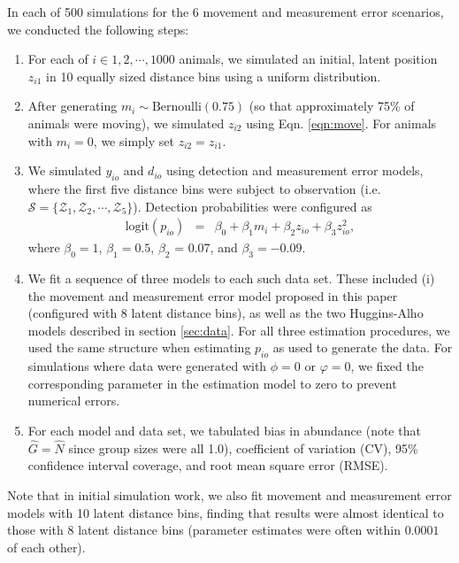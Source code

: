 \documentclass[12pt,fleqn]{article}
\begin{document}
In each of 500 simulations for the 6 movement and measurement error scenarios, we conducted the following steps:
\begin{enumerate}
  \item For each of $i \in 1,2,\cdots,1000$ animals, we simulated an initial, latent position $z_{i1}$ in 10 equally sized distance bins using a uniform distribution.
  \item After generating $m_i \sim \text{Bernoulli}(0.75)$ (so that approximately 75\% of animals were moving), we simulated $z_{i2}$ using Eqn. \ref{eqn:move}.  For animals with $m_i=0$, we simply set $z_{i2}=z_{i1}$.
  \item We simulated $y_{io}$ and $d_{io}$ using detection and measurement error models, where the first five distance bins were subject to observation (i.e. $\mathcal{S} = \{ \mathcal{Z}_1, \mathcal{Z}_2, \cdots, \mathcal{Z}_5 \} $).  Detection probabilities were configured as
      \begin{eqnarray*}
        \text{logit}(p_{io}) & = & \beta_0 + \beta_1 m_i + \beta_2 z_{io} + \beta_3 z_{io}^2,
      \end{eqnarray*}
      where $\beta_0 = 1$, $\beta_1 = 0.5$, $\beta_2$ = 0.07, and $\beta_3 = -0.09$.
  \item We fit a sequence of three models to each such data set.  These included (i) the movement and measurement error model proposed in this paper (configured with 8 latent distance bins), as well as the two Huggins-Alho models described in section \ref{sec:data}. For all three estimation procedures, we used the same structure when estimating $p_{io}$ as used to generate the data.  For simulations where data were generated with $\phi=0$ or $\varphi=0$, we fixed the corresponding parameter in the estimation model to zero to prevent numerical errors.
  \item For each model and data set, we tabulated bias in abundance (note that $\hat{G}=\hat{N}$ since group sizes were all 1.0), coefficient of variation (CV), 95\% confidence interval coverage, and root mean square error (RMSE).
\end{enumerate}
Note that in initial simulation work, we also fit movement and measurement error models with 10 latent distance bins, finding that results were almost identical to those with 8 latent distance bins (parameter estimates were often within $0.0001$ of each other).
\end{document}
